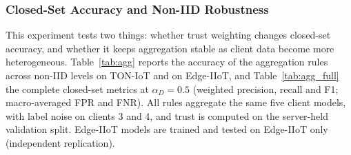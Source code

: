 \documentclass[pdflatex,sn-mathphys-num]{sn-jnl}
\begin{document}
{{\color{black}
\subsubsection{Closed-Set Accuracy and Non-IID Robustness}
This experiment tests two things: whether trust weighting changes closed-set accuracy, and whether it keeps aggregation stable as client data become more heterogeneous. Table~\ref{tab:agg} reports the accuracy of the aggregation rules across non-IID levels on TON-IoT and on Edge-IIoT, and Table~\ref{tab:agg_full} the complete closed-set metrics at $\alpha_D=0.5$ (weighted precision, recall and F1; macro-averaged FPR and FNR). All rules aggregate the same five client models, with label noise on clients 3 and 4, and trust is computed on the server-held validation split. Edge-IIoT models are trained and tested on Edge-IIoT only (independent replication).

\begin{table}[!htbp]\centering
\color{black}
\caption{Closed-set accuracy (\%) of the aggregation rules on the same five client models (mean $\pm$ std over ten seeds).}\label{tab:agg}
\footnotesize
\setlength{\tabcolsep}{4pt}
\end{table}

}}
\end{document}
